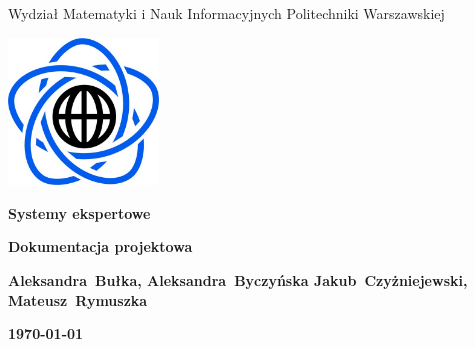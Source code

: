 \documentclass[10pt,a4paper]{article}
\begin{document}
\begin{titlepage}
\begin{center}
{\fontsize{14}{12}\selectfont Wydział Matematyki i Nauk Informacyjnych Politechniki Warszawskiej}

\end{center}

\vspace{1cm}
\begin{center}
\includegraphics[width=0.3\textwidth]{images/logo.png}
\end{center}
\vspace{3cm}

\begin{center}
\textbf{{\fontsize{26}{12}\selectfont Systemy ekspertowe}}

\vspace{2cm}
\textbf{{\fontsize{22}{12}\selectfont Dokumentacja projektowa}}
\vspace{1cm}

\textbf{{\fontsize{13.5}{12}\selectfont Aleksandra~Bułka, Aleksandra~Byczyńska Jakub~Czyżniejewski, Mateusz~Rymuszka}}

\vspace{6cm}
\textbf{{\fontsize{13.5}{12}\selectfont \today}}
\end{center}  
\end{titlepage}
\end{document}
